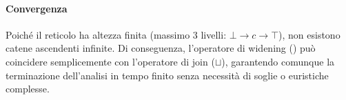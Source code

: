 \paragraph{Convergenza}
Poiché il reticolo ha altezza finita (massimo 3 livelli: $\bot \to c \to
\top$), non esistono catene ascendenti infinite.
Di conseguenza, l'operatore di widening () può
coincidere semplicemente con l'operatore di join ($\sqcup$), garantendo
comunque la terminazione dell'analisi in tempo finito senza necessità
di soglie o euristiche complesse.